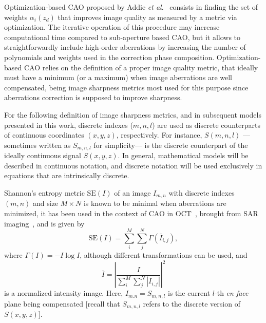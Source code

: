 Optimization-based CAO proposed by Addie \textit{et al}.~\cite{Adie2012_Computational} consists in finding the set of weights $\alpha_i(z_d)$ that improves image quality as measured by a metric via optimization. The iterative operation of this procedure may increase computational time compared to sub-aperture based CAO, but it allows to straightforwardly include high-order aberrations by increasing the number of polynomials and weights used in the correction phase composition. Optimization-based CAO relies on the definition of a proper image quality metric, that ideally must have a minimum (or a maximum) when image aberrations are well compensated, being image sharpness metrics most used for this purpose since aberrations correction is supposed to improve sharpness.

For the following definition of image sharpness metrics, and in subsequent models presented in this work, discrete indexes ($m, n, l$) are used as discrete counterparts of continuous coordinates $(x,y,z)$, respectively. For instance, $S(m,n,l)$ ---sometimes written as $S_{m,n,l}$ for simplicity--- is the discrete counterpart of the ideally continuous signal $S(x,y,z)$. In general, mathematical models will be described in continuous notation, and discrete notation will be used exclusively in equations that are intrinsically discrete.

Shannon's entropy metric $\text{SE}(I)$ of an image $I_{m,n}$ with discrete indexes $(m,n)$ and size $M\times N$ is known to be minimal when aberrations are minimized, it has been used in the context of CAO in OCT~\cite{Hillmann2016_Aberrationfree}, brought from SAR imaging~\cite{Flores1992_Robust}, and is given by
\begin{equation}\label{eq:SE}
	\text{SE}(I) = \sum_i^M\sum_j^N \Gamma(\bar{I}_{i,j}),
\end{equation}
where $\Gamma(I) = -I\log I$, although different transformations can be used, and
\begin{equation}
	\bar{I} = \left|\frac{I}{\sum_i^M\sum_j^N \left|I_{i,j}\right|}\right|^2
\end{equation}
is a normalized intensity image. Here, $I_{m.n}=S_{m,n,l}$ is the current $l$-th \textit{en face} plane being compensated [recall that $S_{m,n,l}$ refers to the discrete version of $S(x,y,z)$].

